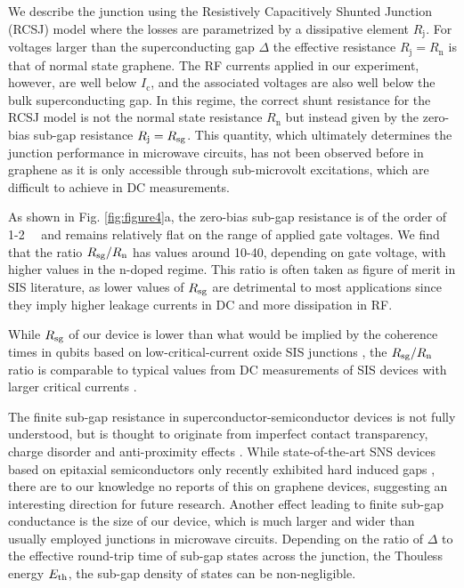 \documentclass[preprint,
  onecolumn,
  notitlepage,
  amsmath,amssymb,
  aip,
  apl,
]{revtex4-1}
\begin{document}
We describe the junction using the Resistively Capacitively Shunted Junction (RCSJ) model where the losses are parametrized by a dissipative element $R_\textrm{j}$.
For voltages larger than the superconducting gap $\Delta$ the effective resistance $R_\textrm{j} = R_\textrm{n}$ is that of normal state graphene.
The RF currents applied in our experiment, however, are well below $I_\textrm{c}$, and the associated voltages are also well below the bulk superconducting gap.
In this regime, the correct shunt resistance for the RCSJ model is not the normal state resistance $R_\textrm{n}$ but instead given by the zero-bias sub-gap resistance $R_\textrm{j} = R_{\rm sg}$.
This quantity, which ultimately determines the junction performance in microwave circuits, has not been observed before in graphene as it is only accessible through sub-microvolt excitations, which are difficult to achieve in DC measurements.

As shown in Fig. \ref{fig:figure4}a, the zero-bias sub-gap resistance is of the order of 1-\SI{2}{\kilo\Omega} and remains relatively flat on the range of applied gate voltages.
We find that the ratio $R_{\rm sg}/R_\textrm{n}$ has values around 10-40, depending on gate voltage, with higher values in the n-doped regime.
This ratio is often taken as figure of merit in SIS literature, as lower values of $R_{\rm sg}$ are detrimental to most applications since they imply higher leakage currents in DC and more dissipation in RF.

While $R_{\rm sg}$ of our device is lower than what would be implied by the coherence times in qubits based on low-critical-current oxide SIS junctions \cite{paik_observation_2011a}, the $R_{\rm sg}/R_\textrm{n}$ ratio is comparable to typical values from DC measurements of SIS devices with larger critical currents \cite{iosad_characterization_2002a,tolpygo_subgap_2013}.

The finite sub-gap resistance in superconductor-semiconductor devices is not fully understood, but is thought to originate from imperfect contact transparency, charge disorder and anti-proximity effects \cite{liu_phenomenology_2017a,bretheau_tunnelling_2017a}.
While state-of-the-art SNS devices based on epitaxial semiconductors only recently exhibited hard induced gaps \cite{chang_hard_2015,kjaergaard_quantized_2016}, there are to our knowledge no reports of this on graphene devices, suggesting an interesting direction for future research.
Another effect leading to finite sub-gap conductance is the size of our device, which is much larger and wider than usually employed junctions in microwave circuits.
Depending on the ratio of $\Delta$ to the effective round-trip time of sub-gap states across the junction, the Thouless energy $E_{\rm th}$, the sub-gap density of states can be non-negligible.
\end{document}
